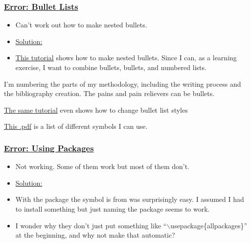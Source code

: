 \documentclass[12pt]{article}
\begin{document}
\subsubsection{\underline{Error: Bullet Lists}}\label{error:er2}
\begin{itemize}
    \item Can’t work out how to make nested bullets.
\end{itemize}
\begin{itemize}
\renewcommand{\labelitemi}{$\nobullet$}
\item \underline{Solution:}
\renewcommand{\labelitemi}{$\bullet$}
    \item \href{https://www.overleaf.com/learn/latex/Lists}{This tutorial} shows how to make nested bullets. Since I can, as a learning exercise, I want to combine bullets, bullets, and numbered lists.
\end{itemize}

I’m numbering the parts of my methodology, including the writing process and the bibliography creation. The pains and pain relievers can be bullets.

\href{https://www.overleaf.com/learn/latex/Lists}{The same tutorial} even shows how to change bullet list styles

\href{http://www.rpi.edu/dept/arc/training/latex/LaTeX_symbols.pdf}{This .pdf} is a list of different symbols I can use. 

\subsubsection{\underline{Error: Using Packages}}\label{error:er3}
\begin{itemize}
    \item Not working. Some of them work but most of them don’t.
\end{itemize}
\begin{itemize}
\renewcommand{\labelitemi}{$\nobullet$}
\item \underline{Solution:}
\renewcommand{\labelitemi}{$\bullet$}
    \item \usepackage{} With the package the symbol is from was surprisingly easy. I assumed I had to install something but just naming the package seems to work. 
    \item I wonder why they don’t just put something like “$\backslash$usepackage\{allpackages\}” at the beginning, and why not make that automatic?
\end{itemize}
    
\end{document}
